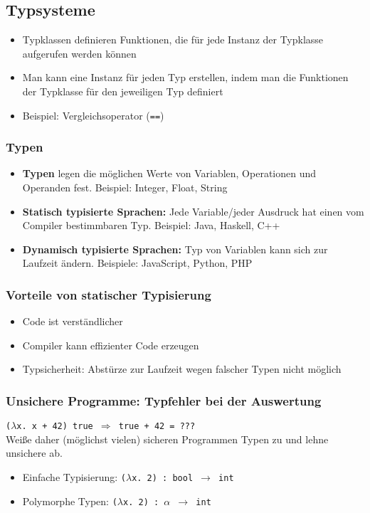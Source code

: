 \subsection{Typsysteme}
\begin{itemize}
	\item Typklassen definieren Funktionen, die für jede Instanz der Typklasse aufgerufen werden können
	\item Man kann eine Instanz für jeden Typ erstellen, indem man die Funktionen der Typklasse für den jeweiligen Typ definiert
	\item Beispiel: Vergleichsoperator (\texttt{==})
\end{itemize}

\subsubsection{Typen}
\begin{itemize}
	\item \textbf{Typen} legen die möglichen Werte von Variablen, Operationen und Operanden fest. Beispiel: Integer, Float, String
	\item \textbf{Statisch typisierte Sprachen:} Jede Variable/jeder Ausdruck hat einen vom Compiler bestimmbaren Typ. Beispiel: Java, Haskell, C++
	\item \textbf{Dynamisch typisierte Sprachen:} Typ von Variablen kann sich zur Laufzeit ändern. Beispiele: JavaScript, Python, PHP
\end{itemize}

\subsubsection{Vorteile von statischer Typisierung}
\begin{itemize}
	\item Code ist verständlicher
	\item Compiler kann effizienter Code erzeugen
	\item Typsicherheit: Abstürze zur Laufzeit wegen falscher Typen nicht möglich
\end{itemize}

\subsubsection{Unsichere Programme: Typfehler bei der Auswertung}
\texttt{(\(\lambda\)x. x + 42) true \(\Rightarrow\) true + 42 = ???} \\
Weiße daher (möglichst vielen) sicheren Programmen Typen zu und lehne unsichere ab.
\begin{itemize}
	\item Einfache Typisierung: \texttt{(\(\lambda\)x. 2) : bool \(\rightarrow\) int}
	\item Polymorphe Typen: \texttt{(\(\lambda\)x. 2) : \(\alpha\) \(\rightarrow\) int}
\end{itemize}

